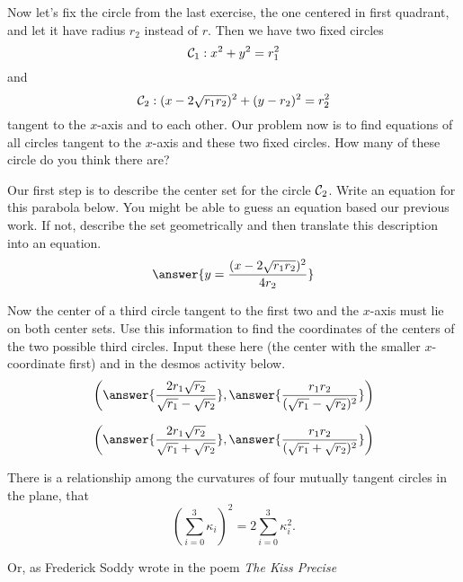 \documentclass{ximera}
\begin{document}
\begin{exploration}
Now let's fix the circle from the last exercise, the one centered in first quadrant, and let it have radius $r_2$ instead of $r$. Then we have two fixed circles
\[
   {\cal C}_1: x^2 + y^2 = r_1^2
\]
and
\[
  {\cal C}_2:  (x-2\sqrt{r_1r_2})^2 + (y-r_2)^2 = r_2^2
\]
tangent to the $x$-axis and to each other. Our problem now is to find equations of all circles tangent to the $x$-axis and these two fixed circles. How many of these circle do you think there are?


\begin{question}   \label{Q5693:Spheres}
Our first step is to describe the center set for the circle ${\cal C}_2$. Write an equation for this parabola below. You might be able to guess an equation based our previous work. If not, describe the set geometrically and then translate this description into an equation. 
\[
    \answer{y=\frac{(x-2\sqrt{r_1r_2})^2}{4r_2}}
\]
\end{question}

Now the center of a third circle tangent to the first two and the $x$-axis must lie on both center sets. Use this information to find the coordinates of the centers of the two possible third circles. Input these here (the center with the smaller $x$-coordinate first) and in the desmos activity below.
\[
   \left( \answer{\frac{2r_1\sqrt{r_2}}{\sqrt{r_1} -\sqrt{r_2}}} , \answer{\frac{r_1 r_2}{(\sqrt{r_1} -\sqrt{r_2})^2}}  \right) 
\]

\[
   \left( \answer{\frac{2r_1\sqrt{r_2}}{\sqrt{r_1} +\sqrt{r_2}}} , \answer{\frac{r_1 r_2}{(\sqrt{r_1} +\sqrt{r_2})^2}}  \right) 
\]


 
\begin{onlineOnly}
    \begin{center}
\end{center}
\end{onlineOnly}
\end{exploration}


There is a relationship among the curvatures of four mutually tangent circles in the plane, that
\[
    \left( \sum_{i=0}^3 \kappa_i \right)^2 = 2 \sum_{i=0}^3 \kappa_i^2 .     \label{Eq:Q1TangentSpheres}
\]

Or, as Frederick Soddy wrote in the poem \it{The Kiss Precise}
\end{document}
